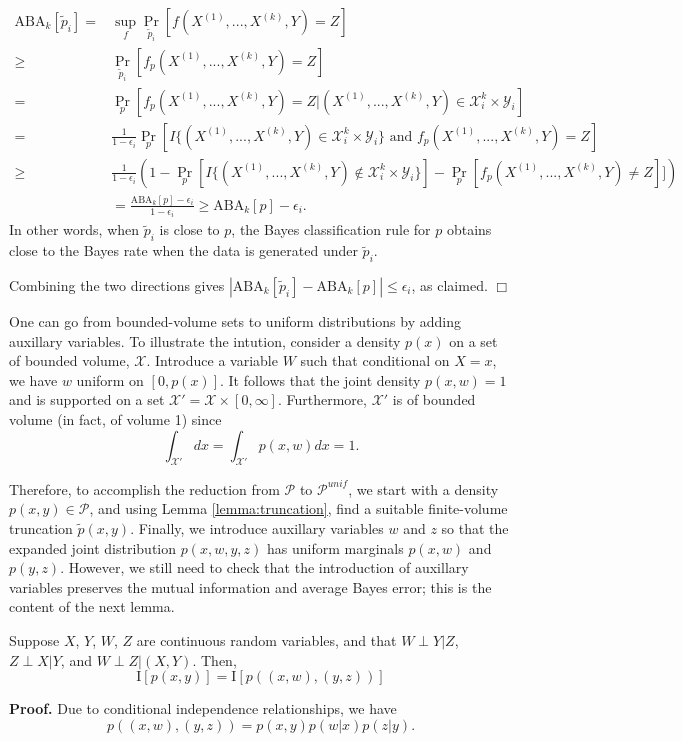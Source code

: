 \begin{align*}
\text{ABA}_k[\tilde{p}_i] =& \sup_f \Pr_{\tilde{p}_i}[f(X^{(1)},...,X^{(k)}, Y) = Z]
\\\geq &  \Pr_{\tilde{p}_i}[f_p(X^{(1)},...,X^{(k)}, Y) = Z]
\\=& \Pr_p[f_p(X^{(1)},...,X^{(k)}, Y) = Z| (X^{(1)},...,X^{(k)}, Y)\in \mathcal{X}_i^k \times \mathcal{Y}_i]
\\=& \frac{1}{1-\epsilon_i} \Pr_p[I\{(X^{(1)},...,X^{(k)}, Y)\in \mathcal{X}_i^k \times \mathcal{Y}_i\} \text{ and }f_p(X^{(1)},...,X^{(k)}, Y) = Z]
\\\geq & \frac{1}{1-\epsilon_i} \left(1 - \Pr_p[I\{(X^{(1)},...,X^{(k)}, Y)\notin \mathcal{X}_i^k \times \mathcal{Y}_i\}] - \Pr_p[f_p(X^{(1)},...,X^{(k)}, Y) \neq Z]]\right)
\\&= \frac{\text{ABA}_k[p] - \epsilon_i}{1-\epsilon_i} \geq \text{ABA}_k[p] - \epsilon_i.
\end{align*}
In other words, when $\tilde{p}_i$ is close to $p$, the Bayes
classification rule for $p$ obtains close to the Bayes rate when the
data is generated under $\tilde{p}_i$.

Combining the two directions gives $|\text{ABA}_k[\tilde{p}_i]
- \text{ABA}_k[p]| \leq \epsilon_i$, as claimed. $\Box$

One can go from bounded-volume sets to uniform distributions by adding
auxillary variables.  To illustrate the intution, consider a density
$p(x)$ on a set of bounded volume, $\mathcal{X}$.  Introduce a
variable $W$ such that conditional on $X = x$, we have $w$ uniform on
$[0, p(x)]$.  It follows that the joint density $p(x, w) = 1$ and is
supported on a set $\mathcal{X}' = \mathcal{X} \times [0,\infty]$.
Furthermore, $\mathcal{X}'$ is of bounded volume (in fact, of volume 1) since
\[
\int_{\mathcal{X}'} dx = \int_{\mathcal{X}'} p(x, w) dx = 1.
\]

Therefore, to accomplish the reduction from $\mathcal{P}$ to
$\mathcal{P}^{unif}$, we start with a density
$p(x,y) \in \mathcal{P}$, and using Lemma \ref{lemma:truncation},
find a suitable finite-volume truncation $\tilde{p}(x, y).$ Finally,
we introduce auxillary variables $w$ and $z$ so that the expanded
joint distribution $p(x, w, y, z)$ has uniform marginals $p(x, w)$ and
$p(y, z)$.  However, we still need to check that the introduction of
auxillary variables preserves the mutual information and average Bayes
error; this is the content of the next lemma.

\begin{lemma}
Suppose $X$, $Y$, $W$, $Z$ are continuous random variables, and that
$W\perp Y|Z$, $Z \perp X|Y$, and $W \perp Z|(X,Y)$.  Then,
\[
\text{I}[p(x, y)] = \text{I}[p((x,w), (y,z))]
\]
\end{lemma}
\textbf{Proof.}
Due to conditional independence relationships, we have
\[
p((x,w), (y,z)) = p(x,y)p(w|x)p(z|y).
\]

